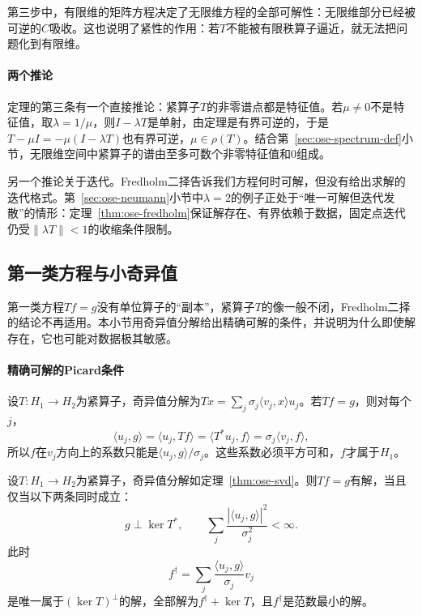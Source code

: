 第三步中，有限维的矩阵方程决定了无限维方程的全部可解性：无限维部分已经被可逆的$C$吸收。这也说明了紧性的作用：若$T$不能被有限秩算子逼近，就无法把问题化到有限维。

\paragraph{两个推论}
定理的第三条有一个直接推论：紧算子$T$的非零谱点都是特征值。若$\mu\neq0$不是特征值，取$\lambda=1/\mu$，则$I-\lambda T$是单射，由定理是有界可逆的，于是$T-\mu I=-\mu(I-\lambda T)$也有界可逆，$\mu\in\rho(T)$。结合第~\ref{sec:ose-spectrum-def}小节，无限维空间中紧算子的谱由至多可数个非零特征值和$0$组成。

另一个推论关于迭代。Fredholm二择告诉我们方程何时可解，但没有给出求解的迭代格式。第~\ref{sec:ose-neumann}小节中$\lambda=2$的例子正处于“唯一可解但迭代发散”的情形：定理~\ref{thm:ose-fredholm}保证解存在、有界依赖于数据，固定点迭代仍受$\|\lambda T\|<1$的收缩条件限制。

\subsection{第一类方程与小奇异值}
\label{sec:ose-first-kind}

第一类方程$Tf=g$没有单位算子的“副本”，紧算子$T$的像一般不闭，Fredholm二择的结论不再适用。本小节用奇异值分解给出精确可解的条件，并说明为什么即使解存在，它也可能对数据极其敏感。

\paragraph{精确可解的Picard条件}
设$T:H_1\to H_2$为紧算子，奇异值分解为$Tx=\sum_j\sigma_j\langle v_j,x\rangle u_j$。若$Tf=g$，则对每个$j$，
\[
  \langle u_j,g\rangle=\langle u_j,Tf\rangle=\langle T^*u_j,f\rangle=\sigma_j\langle v_j,f\rangle ,
\]
所以$f$在$v_j$方向上的系数只能是$\langle u_j,g\rangle/\sigma_j$。这些系数必须平方可和，$f$才属于$H_1$。

\begin{theorem}[第一类方程的可解性与最小范数解]
\label{thm:ose-picard}
设$T:H_1\to H_2$为紧算子，奇异值分解如定理~\ref{thm:ose-svd}。则$Tf=g$有解，当且仅当以下两条同时成立：
\begin{equation}
  g\perp\ker T^*,\qquad \sum_j\frac{|\langle u_j,g\rangle|^2}{\sigma_j^2}<\infty .
  \label{eq:ose-picard}
\end{equation}
此时
\[
  f^\dagger=\sum_j\frac{\langle u_j,g\rangle}{\sigma_j}v_j
\]
是唯一属于$(\ker T)^\perp$的解，全部解为$f^\dagger+\ker T$，且$f^\dagger$是范数最小的解。
\end{theorem}

